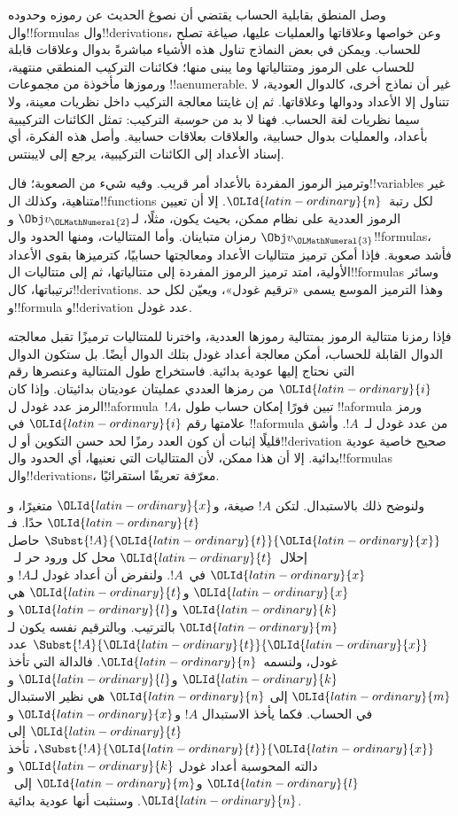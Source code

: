\documentclass[../../../include/open-logic-section]{subfiles}
\begin{document}

وصل المنطق بقابلية الحساب يقتضي أن نصوغ الحديث
عن رموزه وحدوده وال!!{formula}s وال!!{derivation}s،
وعن خواصها وعلاقاتها والعمليات عليها، صياغة تصلح
للحساب. ويمكن في بعض النماذج تناول هذه الأشياء
مباشرةً بدوال وعلاقات قابلة للحساب على الرموز
ومتتالياتها وما يبنى منها؛ فكائنات التركيب
المنطقي منتهية، ورموزها مأخوذة من مجموعات
!!a{enumerable}. غير أن نماذج أخرى، كالدوال
العودية، لا تتناول إلا الأعداد ودوالها وعلاقاتها.
ثم إن غايتنا معالجة التركيب داخل نظريات معينة،
ولا سيما نظريات لغة الحساب. فهنا لا بد من
\emph{حوسبة} التركيب: تمثل الكائنات التركيبية
بأعداد، والعمليات بدوال حسابية، والعلاقات
بعلاقات حسابية. وأصل هذه الفكرة، أي إسناد
الأعداد إلى الكائنات التركيبية، يرجع إلى لايبنتس.

وترميز الرموز المفردة بالأعداد أمر قريب.
وفيه شيء من الصعوبة؛ فال!!{variable}s غير
متناهية، وكذلك ال!!{function}s لكل رتبة~${\OLId{latin-ordinary}{n}}$.
إلا أن تعيين الرموز العددية على نظام ممكن،
بحيث يكون، مثلًا، لـ$\Obj v_{\OLMathNumeral{2}}$ و$\Obj v_{\OLMathNumeral{3}}$
رمزان متباينان. وأما المتتاليات، ومنها الحدود
وال!!{formula}s، فأشد صعوبة. فإذا أمكن
ترميز متتاليات الأعداد ومعالجتها حسابيًا،
كترميزها بقوى الأعداد الأولية، امتد ترميز
الرموز المفردة إلى متتالياتها، ثم إلى
متتاليات ال!!{formula}s وسائر ترتيباتها،
كال!!{derivation}s. وهذا الترميز الموسع
يسمى «ترقيم غودل»، ويعيّن لكل حد
و!!{formula} و!!{derivation} عدد غودل.

فإذا رمزنا متتالية الرموز بمتتالية رموزها العددية،
واخترنا للمتتاليات ترميزًا تقبل معالجته الدوال
القابلة للحساب، أمكن معالجة أعداد غودل
بتلك الدوال أيضًا. بل ستكون الدوال التي
نحتاج إليها عودية بدائية. فاستخراج طول
المتتالية وعنصرها رقم ${\OLId{latin-ordinary}{i}}$ من رمزها العددي
عمليتان عوديتان بدائيتان. وإذا كان الرمز
عدد غودل ل!!a{formula}~$!A$، تبين فورًا
إمكان حساب طول !!a{formula} ورمز علامتها
رقم ${\OLId{latin-ordinary}{i}}$ في !!a{formula} من عدد غودل لـ~$!A$.
وأشق قليلًا إثبات أن كون العدد رمزًا لحد
حسن التكوين أو ل!!{derivation} صحيح خاصية
عودية بدائية. إلا أن هذا ممكن، لأن
المتتاليات التي نعنيها، أي الحدود
وال!!{formula}s وال!!{derivation}s،
معرّفة تعريفًا استقرائيًا.

ولنوضح ذلك بالاستبدال. لتكن $!A$ صيغة،
و${\OLId{latin-ordinary}{x}}$ متغيرًا، و${\OLId{latin-ordinary}{t}}$ حدًا. فـ$\Subst{!A}{{\OLId{latin-ordinary}{t}}}{{\OLId{latin-ordinary}{x}}}$
حاصل إحلال~${\OLId{latin-ordinary}{t}}$ محل كل ورود حر لـ~${\OLId{latin-ordinary}{x}}$
في~$!A$. ولنفرض أن أعداد غودل لـ$!A$
و${\OLId{latin-ordinary}{x}}$ و${\OLId{latin-ordinary}{t}}$ هي ${\OLId{latin-ordinary}{k}}$ و${\OLId{latin-ordinary}{l}}$ و${\OLId{latin-ordinary}{m}}$ بالترتيب.
وبالترقيم نفسه يكون لـ$\Subst{!A}{{\OLId{latin-ordinary}{t}}}{{\OLId{latin-ordinary}{x}}}$
عدد غودل، ولنسمه~${\OLId{latin-ordinary}{n}}$. فالدالة التي تأخذ
${\OLId{latin-ordinary}{k}}$ و${\OLId{latin-ordinary}{l}}$ و${\OLId{latin-ordinary}{m}}$ إلى ${\OLId{latin-ordinary}{n}}$ هي نظير الاستبدال
في الحساب. فكما يأخذ الاستبدال $!A$
و${\OLId{latin-ordinary}{x}}$ و${\OLId{latin-ordinary}{t}}$ إلى $\Subst{!A}{{\OLId{latin-ordinary}{t}}}{{\OLId{latin-ordinary}{x}}}$،
تأخذ دالته المحوسبة أعداد غودل ${\OLId{latin-ordinary}{k}}$
و${\OLId{latin-ordinary}{l}}$ و${\OLId{latin-ordinary}{m}}$ إلى~${\OLId{latin-ordinary}{n}}$. وسنثبت أنها عودية بدائية.
\end{document}
